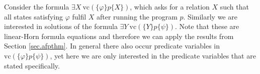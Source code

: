 \documentclass[acmsmall]{acmart}
\theoremstyle{plain}
\newtheorem{theorem}{Theorem}
\theoremstyle{definition}
\newcommand{\calL}{\mathcal{L}}
\newcommand{\calM}{\mathcal{M}}
\newcommand{\mybar}[1]{\overline{#1}}
\newcommand{\lfp}{\mathrm{lfp}} %
\newcommand{\hoare}[3]{\{#1\}#2\{#3\}}
\newcommand{\vc}{\mathrm{vc}}
\newcommand{\hwhile}{\textbf{while}~}
\newcommand{\hdo}{~\textbf{do}~}
\renewcommand{\wp}{\mathrm{wp}}
\renewcommand{\sp}{\mathrm{sp}}
\begin{document}

Consider the formula $\exists X ~\vc(\hoare{\varphi}{p}{X})$, which asks for a relation $X$ such that all states satisfying $\varphi$ fulfil $X$ after running the program $p$. Similarly we are interested in solutions of the formula $\exists Y ~\vc(\hoare{Y}{p}{\psi})$. Note that these are linear-Horn formula equations and therefore we can apply the results from Section \ref{sec.afpthm}. In general there also occur predicate variables in $\vc(\hoare{\varphi}{p}{\psi})$, yet here we are only interested in the predicate variables that are stated specifically.
\end{document}
